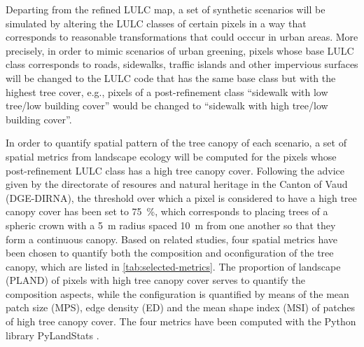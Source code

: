 \documentclass[12pt]{iopart}
\begin{document}
Departing from the refined LULC map, a set of synthetic scenarios will be simulated by altering the LULC classes of certain pixels in a way that corresponds to reasonable transformations that could occcur in urban areas.
More precisely, in order to mimic scenarios of urban greening, pixels whose base LULC class corresponds to roads, sidewalks, traffic islands and other impervious surfaces will be changed to the LULC code that has the same base class but with the highest tree cover, e.g.,  pixels of a post-refinement class ``sidewalk with low tree/low building cover'' would be changed to ``sidewalk with high tree/low building cover''.

In order to quantify spatial pattern of the tree canopy of each scenario, a set of spatial metrics from landscape ecology \cite{o1988indices,mcgarigal2012fragstats} will be computed for the pixels whose post-refinement LULC class has a high tree canopy cover.  %
Following the advice given by the directorate of resoures and natural heritage in the Canton of Vaud (DGE-DIRNA), the threshold over which a pixel is considered to have a high tree canopy cover has been set to 75~\%, which corresponds to placing trees of a spheric crown with a 5~m radius spaced 10~m from one another so that they form a continuous canopy.
Based on related studies, four spatial metrics have been chosen to quantify both the composition and oconfiguration of the tree canopy, which are listed in \autoref{tab:selected-metrics}. The proportion of landscape (PLAND) of pixels with high tree canopy cover serves to quantify the composition aspects, while the configuration is quantified by means of the mean patch size (MPS), edge density (ED) and the mean shape index (MSI) of patches of high tree canopy cover. The four metrics have been computed with the Python library PyLandStats \cite{bosch2019pylandstats}.
\end{document}
